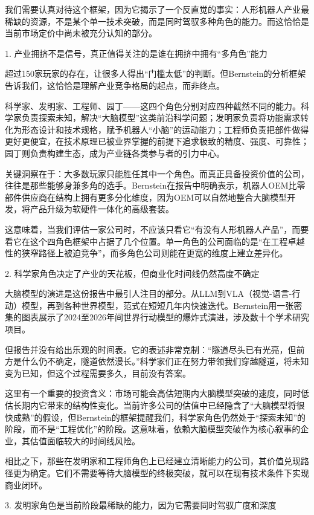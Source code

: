 \documentclass[11pt]{ctexart}
\begin{document}
我们需要认真对待这个框架，因为它揭示了一个反直觉的事实：人形机器人产业最稀缺的资源，不是某个单一技术突破，而是同时驾驭多种角色的能力。而这恰恰是当前市场定价中尚未被充分认知的部分。

1. 产业拥挤不是信号，真正值得关注的是谁在拥挤中拥有“多角色”能力

超过150家玩家的存在，让很多人得出“门槛太低”的判断。但Bernstein的分析框架告诉我们，这恰恰是理解产业竞争格局的起点，而非终点。

科学家、发明家、工程师、园丁——这四个角色分别对应四种截然不同的能力。科学家负责探索未知，解决“大脑模型”这类前沿科学问题；发明家负责将功能需求转化为形态设计和技术规格，赋予机器人“小脑”的运动能力；工程师负责把部件做得更好更便宜，在技术原理已被业界掌握的前提下追求极致的精度、强度、可靠性；园丁则负责构建生态，成为产业链各类参与者的引力中心。

关键洞察在于：大多数玩家只能胜任其中一个角色。而真正具备投资价值的公司，往往是那些能够身兼多角的选手。Bernstein在报告中明确表示，机器人OEM比零部件供应商在结构上拥有更多分化维度，因为OEM可以自然地整合大脑模型开发，将产品升级为软硬件一体化的高级套装。

这意味着，当我们评估一家公司时，不应该只看它“有没有人形机器人产品”，而要看它在这个四角色框架中占据了几个位置。单一角色的公司面临的是“在工程卓越性的狭窄路径上被迫竞争”，而多角色公司则能在更宽的维度上建立差异化。

2. 科学家角色决定了产业的天花板，但商业化时间线仍然高度不确定

大脑模型的演进是这份报告中最引人注目的部分。从LLM到VLA（视觉-语言-行动）模型，再到各种世界模型，范式在短短几年内快速迭代。Bernstein用一张密集的图表展示了2024至2026年间世界行动模型的爆炸式演进，涉及数十个学术研究项目。

但报告并没有给出乐观的时间表。它的表述非常克制：“隧道尽头已有光亮，但前方是什么仍不确定，隧道依然漫长。”科学家们正在努力带领我们穿越隧道，将未知变为已知，但这个过程需要多久，目前没有答案。

这里有一个重要的投资含义：市场可能会高估短期内大脑模型突破的速度，同时低估长期内它带来的结构性变化。当前许多公司的估值中已经隐含了“大脑模型将很快成熟”的假设，但Bernstein的框架提醒我们，科学家角色仍然处于“探索未知”的阶段，而不是“工程优化”的阶段。这意味着，依赖大脑模型突破作为核心叙事的企业，其估值面临较大的时间线风险。

相比之下，那些在发明家和工程师角色上已经建立清晰能力的公司，其价值兑现路径更为确定。它们不需要等待大脑模型的终极突破，就可以在现有技术条件下实现商业闭环。

3. 发明家角色是当前阶段最稀缺的能力，因为它需要同时驾驭广度和深度
\end{document}
